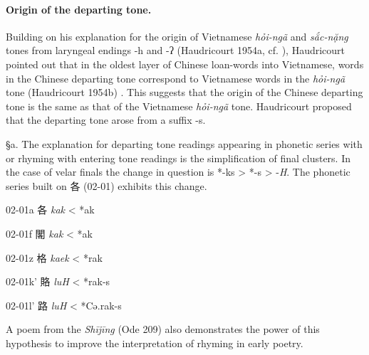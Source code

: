 \paragraph{Origin of the departing
tone.} Building on his explanation for the origin of
Vietnamese \emph{hỏi-ngã }and \emph{sắc-nặng} tones from laryngeal
endings -h and -ʔ 
\citep[]{Haudricourt1954a}
(Haudricourt 1954a, cf. ), Haudricourt pointed out
that in the oldest layer of Chinese loan-words into Vietnamese, words in
the Chinese departing tone correspond to Vietnamese words in the
 \emph{hỏi-ngã} tone (Haudricourt 1954b)
 \citep[]{Haudricourt1954b}. This suggests that the origin
of the Chinese departing tone is the same as that of the Vietnamese
 \emph{hỏi-ngã} tone. Haudricourt proposed that the departing tone arose
from a suffix -s.

§a. The explanation for departing tone readings appearing in phonetic
series with or rhyming with entering tone readings is the simplification
of final clusters. In the case of velar finals the change in question is
*-ks \textgreater{} *-s \textgreater{} -\emph{H}. The phonetic series
built on 各 (02-01) exhibits this change.

\begin{description} \item
02-01a 各 \emph{kak} \textless{} *{}ak

\item
02-01f 閣 \emph{kak} \textless{} *{}ak

\item
02-01z 格 \emph{kaek} \textless{} *{}rak

\item
02-01k' 賂 \emph{luH} \textless{} *r{}ak-s

\item
02-01l' 路 \emph{luH} \textless{} *Cə.r{}ak-s
\end{description}

A poem from the \emph{Shījīng} (Ode 209) also demonstrates the power of
this hypothesis to improve the interpretation of rhyming in early
poetry.

